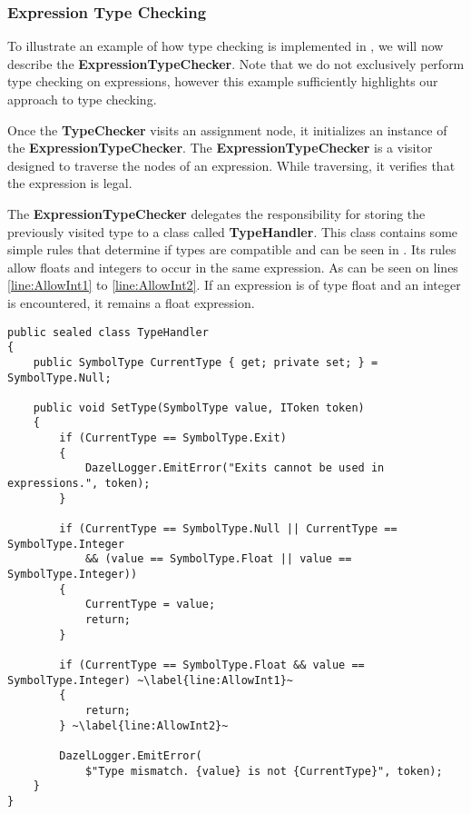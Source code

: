 \subsubsection*{Expression Type Checking} \label{sec:ExpressionTypeChecking}
To illustrate an example of how type checking is implemented in \dazel{}, we will now describe the \textbf{ExpressionTypeChecker}.
Note that we do not exclusively perform type checking on expressions, however this example sufficiently highlights our approach to type checking.


Once the \textbf{TypeChecker} visits an assignment node, it initializes an instance of the \textbf{ExpressionTypeChecker}. The \textbf{ExpressionTypeChecker} is a visitor designed to traverse the nodes of an expression. While traversing, it verifies that the expression is legal.

The \textbf{ExpressionTypeChecker} delegates the responsibility for storing the previously visited type to a class called \textbf{TypeHandler}. This class contains some simple rules that determine if types are compatible and can be seen in . 
Its rules allow floats and integers to occur in the same expression. As can be seen on lines \ref{line:AllowInt1} to \ref{line:AllowInt2}. If an expression is of type float and an integer is encountered, it remains a float expression.

\begin{lstlisting}[language=CSharp, caption={The \textbf{TypeHandler} class.}, label={lst:TypeHandler},escapechar=~]
public sealed class TypeHandler
{
    public SymbolType CurrentType { get; private set; } = SymbolType.Null;

    public void SetType(SymbolType value, IToken token)
    {
        if (CurrentType == SymbolType.Exit)
        {
            DazelLogger.EmitError("Exits cannot be used in expressions.", token);
        }
            
        if (CurrentType == SymbolType.Null || CurrentType == SymbolType.Integer 
            && (value == SymbolType.Float || value == SymbolType.Integer))
        {
            CurrentType = value;
            return;
        }
            
        if (CurrentType == SymbolType.Float && value == SymbolType.Integer) ~\label{line:AllowInt1}~
        {
            return;
        } ~\label{line:AllowInt2}~
            
        DazelLogger.EmitError(
            $"Type mismatch. {value} is not {CurrentType}", token);
    }
}
\end{lstlisting}


